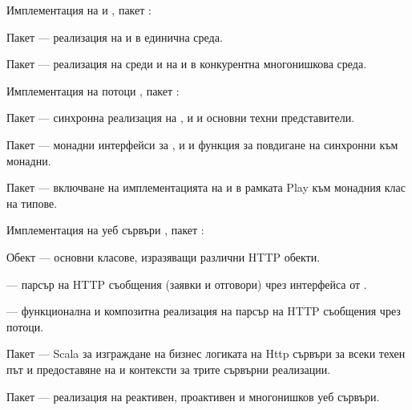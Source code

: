\begin{attachment}{Имплементация на  и }
  \label{att:future-promise}
  , пакет :
  
  \begin{itemize*}
    \item Пакет  — реализация на  и  в единична среда.
    
    \item Пакет  — реализация на среди и на  и  в конкурентна многонишкова среда.
  \end{itemize*}
\end{attachment}

\begin{attachment}{Имплементация на  потоци}
  \label{att:iteratees}
  , пакет :
  
  \begin{itemize*}
    \item Пакет  — синхронна реализация на ,  и  и основни техни представители.
    
    \item Пакет  — монадни интерфейси за ,  и  и функция за повдигане на синхронни  към монадни.
    
    \item Пакет  — включване на имплементацията на  и  в рамката Play към монадния клас на типове.
  \end{itemize*}
\end{attachment}

\begin{attachment}{Имплементация на уеб сървъри}
  \label{att:web-server}
  , пакет :
  
  \begin{itemize*}
    \item Обект  — основни класове, изразяващи различни HTTP обекти.
    
    \item {} — парсър на HTTP съобщения (заявки и отговори) чрез интерфейса от .
    
    \item {} — функционална и композитна реализация на парсър на HTTP съобщения чрез  потоци.
    
    \item Пакет  — Scala  за изграждане на бизнес логиката на Http сървъри за всеки техен път и предоставяне на  и  контексти за трите сървърни реализации.
    
    \item Пакет  — реализация на реактивен, проактивен и многонишков уеб сървъри.
  \end{itemize*}
\end{attachment}
